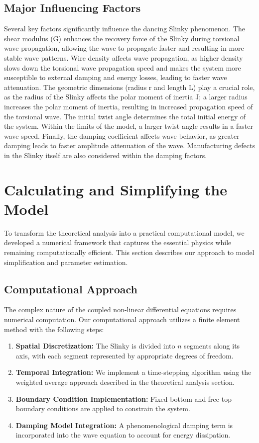 \documentclass{mcmthesis}  %
\begin{document}
\subsection{Major Influencing Factors}
Several key factors significantly influence the dancing Slinky phenomenon. The shear modulus (G) enhances the recovery force of the Slinky during torsional wave propagation, allowing the wave to propagate faster and resulting in more stable wave patterns. Wire density affects wave propagation, as higher density slows down the torsional wave propagation speed and makes the system more susceptible to external damping and energy losses, leading to faster wave attenuation. The geometric dimensions (radius r and length L) play a crucial role, as the radius of the Slinky affects the polar moment of inertia J; a larger radius increases the polar moment of inertia, resulting in increased propagation speed of the torsional wave. The initial twist angle determines the total initial energy of the system. Within the limits of the model, a larger twist angle results in a faster wave speed. Finally, the damping coefficient affects wave behavior, as greater damping leads to faster amplitude attenuation of the wave. Manufacturing defects in the Slinky itself are also considered within the damping factors.

\section{Calculating and Simplifying the Model}  %

To transform the theoretical analysis into a practical computational model, we developed a numerical framework that captures the essential physics while remaining computationally efficient. This section describes our approach to model simplification and parameter estimation.

\subsection{Computational Approach}
The complex nature of the coupled non-linear differential equations requires numerical computation. Our computational approach utilizes a finite element method with the following steps:
\begin{enumerate}
    \item \textbf{Spatial Discretization:} The Slinky is divided into $n$ segments along its axis, with each segment represented by appropriate degrees of freedom.
    \item \textbf{Temporal Integration:} We implement a time-stepping algorithm using the weighted average approach described in the theoretical analysis section.
    \item \textbf{Boundary Condition Implementation:} Fixed bottom and free top boundary conditions are applied to constrain the system.
    \item \textbf{Damping Model Integration:} A phenomenological damping term is incorporated into the wave equation to account for energy dissipation.
\end{enumerate}
\end{document}
